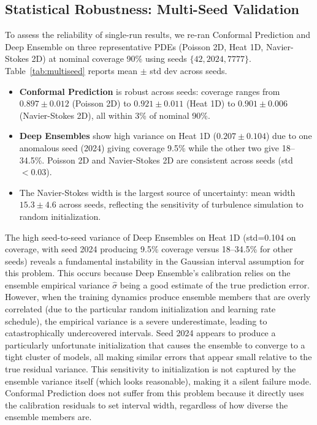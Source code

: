 \documentclass[12pt,a4paper]{article}
\theoremstyle{plain}
\begin{document}
\subsection{Statistical Robustness: Multi-Seed Validation}
\label{sec:multiseed}

To assess the reliability of single-run results, we re-ran Conformal
Prediction and Deep Ensemble on three representative PDEs
(Poisson 2D, Heat 1D, Navier-Stokes 2D) at nominal coverage 90\%
using seeds $\{42, 2024, 7777\}$.  Table~\ref{tab:multiseed} reports
mean $\pm$ std dev across seeds.

\begin{itemize}
    \item \textbf{Conformal Prediction} is robust across seeds:
        coverage ranges from $0.897 \pm 0.012$ (Poisson 2D) to
        $0.921 \pm 0.011$ (Heat 1D) to $0.901 \pm 0.006$ (Navier-Stokes 2D),
        all within 3\% of nominal 90\%.
    \item \textbf{Deep Ensembles} show high variance on Heat 1D
        ($0.207 \pm 0.104$) due to one anomalous seed (2024) giving
        coverage 9.5\% while the other two give 18--34.5\%.
        Poisson 2D and Navier-Stokes 2D are consistent across seeds
        (std $< 0.03$).
    \item The Navier-Stokes width is the largest source of uncertainty:
        mean width $15.3 \pm 4.6$ across seeds, reflecting the sensitivity
        of turbulence simulation to random initialization.
\end{itemize}

The high seed-to-seed variance of Deep Ensembles on Heat 1D (std=0.104 on
coverage, with seed 2024 producing 9.5\% coverage versus 18--34.5\% for other
seeds) reveals a fundamental instability in the Gaussian interval assumption
for this problem. This occurs because Deep Ensemble's calibration relies on
the ensemble empirical variance $\hat\sigma$ being a good estimate of the true
prediction error. However, when the training dynamics produce ensemble members
that are overly correlated (due to the particular random initialization and
learning rate schedule), the empirical variance is a severe underestimate,
leading to catastrophically undercovered intervals. Seed 2024 appears to
produce a particularly unfortunate initialization that causes the ensemble
to converge to a tight cluster of models, all making similar errors that
appear small relative to the true residual variance. This sensitivity to
initialization is not captured by the ensemble variance itself (which looks
reasonable), making it a silent failure mode. Conformal Prediction does not
suffer from this problem because it directly uses the calibration residuals
to set interval width, regardless of how diverse the ensemble members are.
\end{document}
